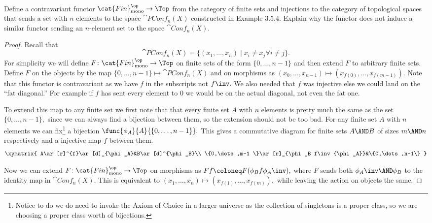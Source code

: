 \documentclass[../../main]{subfiles}
\begin{document}
	\paragraph{}
	\begin{exercise}
		Define a contravariant functor $ \cat{Fin}_{\textrm{mono}}^\op \to
		\Top$ from
		the	category of finite sets and injections to the category of
		topological
		spaces that sends a set with $ n $ elements to the space $
		\cat{PConf}_n(X) $
		constructed in Example 3.5.4. Explain why the functor does not induce a
		similar functor sending an $ n $-element set to the space $ \cat{Conf}_n(X). $
	\end{exercise}

	\begin{proof}
		Recall that
		$$
		\cat{PConf}_n(X)=\{(x_1,\dots,x_n)\mid x_i\neq x_j \forall i\neq j
		\}.
		$$
		For simplicity we will define $ F\colon\cat{Fin}_{\textrm{mono}}^\op
		\to \Top $  on finite sets of the form $ \{0,\dots,n-1\} $ and then
		extend $ F $ to arbitrary finite sets. Define $ F $ on the objects by
		the map $\{0,\dots,n-1\}\mapsto \cat{PConf}_n(X)$ and on morphisms as
		$ (x_0,\dots,x_{n-1})\mapsto (x_{f(0)},\dots, x_{f(m-1)}). $
		Note that this functor is contravariant as we have $f$ in the
		subscripts not $f\inv.$ We also needed that $ f $ was injective else we
		could land on the ``fat diagonal.'' For example if $ f $ has sent every
		element to $ 0 $ we would be on the actual diagonal, not even the fat
		one.

		To extend this map to any finite set we first note that that every
		finite set $ A $ with $ n $ elements
		is pretty much the same as the set $ \{0,\dots,n-1\}, $
		since we can always find a bijection between them, so the
		extension should not be too bad. For any finite set $ A $ with $ n $
		elements we can fix\footnote{Notice to do we do need to invoke the
		Axiom of Choice in a larger universe as the collection of singletons is
		a proper class, so we are choosing a proper class worth of
		bijections.} a bijection $ \func{\phi_A}{A}{\{0,\dots,n-1\}}.$
		This gives a commutative diagram for finite sets $ A\AND B $ of
		sizes $ m\AND n $ respectively and a injective
		map $ f $ between them.
		$$
		\xymatrix{
			A\ar[r]^{f}\ar[d]_{\phi_A}&B\ar[d]^{\phi_B}\\
			\{0,\dots,m-1 \}\ar[r]_{\phi_B f\inv{\phi_A}}&\{0,\dots,n-1\}
		}
		$$

		Now we can extend
		$F\colon\cat{Fin}_{\textrm{mono}}^\op
		\to \Top $
		on morphisms as $ Ff\coloneq F(\phi_B f\phi_A\inv),$
		where $ F $ sends both $\phi_A\inv\AND\phi_B $ to the identity map
		in $ \cat{Conf}_n(X). $
		This is equivalent to $ (x_1,\dots,x_n)\mapsto (x_{f(1)},\dots,
		x_{f(m)}),$ while leaving the action on objects the same.


\end{proof}
\end{document}
